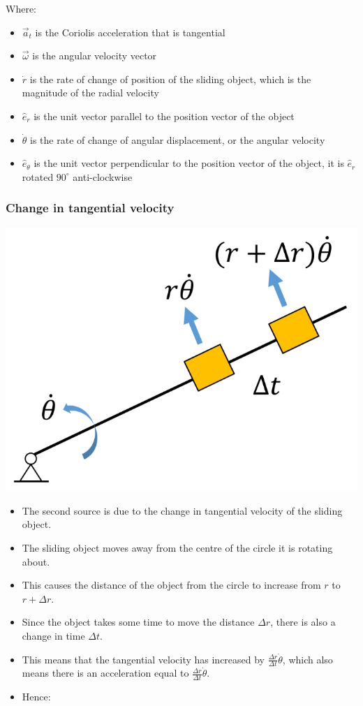 \documentclass[11pt]{article}
\begin{document}
Where:
\begin{itemize}
\item \(\vec{a}_t\) is the Coriolis acceleration that is tangential
\item \(\vec{\omega}\) is the angular velocity vector
\item \(\dot{r}\) is the rate of change of position of the sliding object, which is the magnitude of the radial velocity
\item \(\hat{e}_r\) is the unit vector parallel to the position vector of the object
\item \(\dot{\theta}\) is the rate of change of angular displacement, or the angular velocity
\item \(\hat{e}_{\theta}\) is the unit vector perpendicular to the position vector of the object, it is \(\hat{e}_r\) rotated \(90^{\circ}\) anti-clockwise
\end{itemize}
\subsubsection{Change in tangential velocity}
\label{sec:orge710085}
\begin{center}
\includegraphics[scale=0.62]{./images/change-in-tangential-velocity-coriolis-acceleration.png}
\end{center}
\begin{itemize}
\item The second source is due to the change in tangential velocity of the sliding object.
\item The sliding object moves away from the centre of the circle it is rotating about.
\item This causes the distance of the object from the circle to increase from \(r\) to \(r + \Delta r\).
\item Since the object takes some time to move the distance \(\Delta r\), there is also a change in time \(\Delta t\).
\item This means that the tangential velocity has increased by \(\frac{\Delta r}{\Delta t} \dot{\theta}\), which also means there is an acceleration equal to \(\frac{\Delta r}{\Delta t} \dot{\theta}\).
\item Hence:
\end{itemize}
\end{document}
